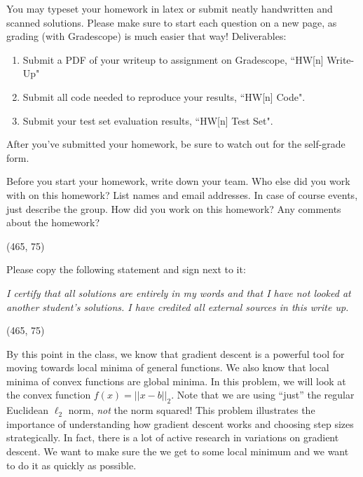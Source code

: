 
You may typeset your homework in latex or submit neatly handwritten and scanned solutions. Please make sure to start each question on a new page, as grading (with Gradescope) is much easier that way! Deliverables:

\begin{enumerate}
  \item Submit a PDF of your writeup to assignment on Gradescope, ``HW[n] Write-Up"
  \item Submit all code needed to reproduce your results, ``HW[n] Code".
  \item Submit your test set evaluation results, ``HW[n] Test Set".
\end{enumerate}

After you've submitted your homework, be sure to watch out for the self-grade form.

\begin{Parts}

\Part Before you start your homework, write down your team. Who else did you work with on this homework? List names and email addresses. In case of course events, just describe the group. How did you work on this homework? Any comments about the homework?

\vspace{15pt}
\framebox(465, 75){}

\Part Please copy the following statement and sign next to it:

\textit{I certify that all solutions are entirely in my words and that I have not looked at another student's solutions. I have credited all external sources in this write up.}

\vspace{15pt}
\framebox(465, 75){}

\end{Parts}

\pagebreak



By this point in the class, we know that gradient descent is a powerful tool for moving towards local minima of general functions. We also know that local minima of convex functions are global minima. In this problem, we will look at the convex function $f(x) = ||x-b||_2$. Note that we are using ``just'' the regular Euclidean $\ell_2$ norm, \emph{not} the norm squared! This problem illustrates the importance of understanding how gradient descent works and choosing step sizes strategically. In fact, there is a lot of active research in variations on gradient descent. We want to make sure the we get to some local minimum and we want to do it as quickly as possible.

